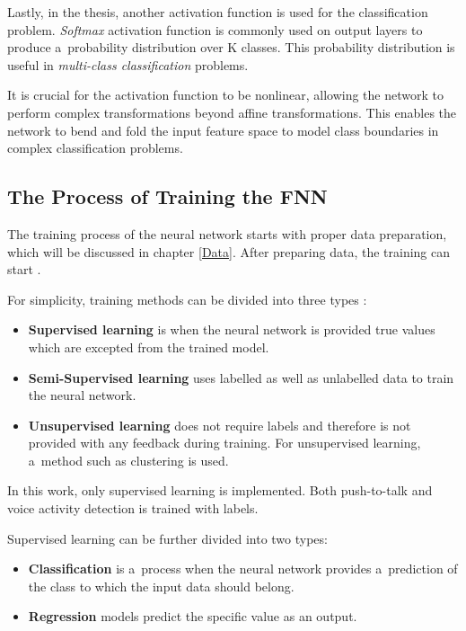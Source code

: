 Lastly, in the thesis, another activation function is used for the classification problem. \textit{Softmax} activation function is commonly used on output layers to produce a~probability distribution over K classes. This probability distribution is useful in \textit{multi-class classification} problems. 

It is crucial for the activation function to be nonlinear, allowing the network to perform complex transformations beyond affine transformations. This enables the network to bend and fold the input feature space to model class boundaries in complex classification problems.
\newpage
\subsection{The Process of Training the FNN}

    The training process of the neural network starts with proper data preparation, which will be discussed in chapter \ref{Data}. After preparing data, the training can start \cite{applyingnn}. 

    For simplicity, training methods can be divided into three types \cite{hajaj_ml_intro}: 

    \begin{itemize}
        \item \textbf{Supervised learning} is when the neural network is provided true values which are excepted from the trained model. 
        \item \textbf{Semi-Supervised learning} uses labelled as well as unlabelled data to train the neural network.
        \item \textbf{Unsupervised learning} does not require labels and therefore is not provided with any feedback during training. For unsupervised learning, a~method such as clustering is used. 
    \end{itemize}
    
    In this work, only supervised learning is implemented. Both push-to-talk and voice activity detection is trained with labels. 

    Supervised learning can be further divided into two types:

    \begin{itemize}
        \item \textbf{Classification} is a~process when the neural network provides a~prediction of the class to which the input data should belong.
        \item  \textbf{Regression} models predict the specific value as an output.
    \end{itemize}

